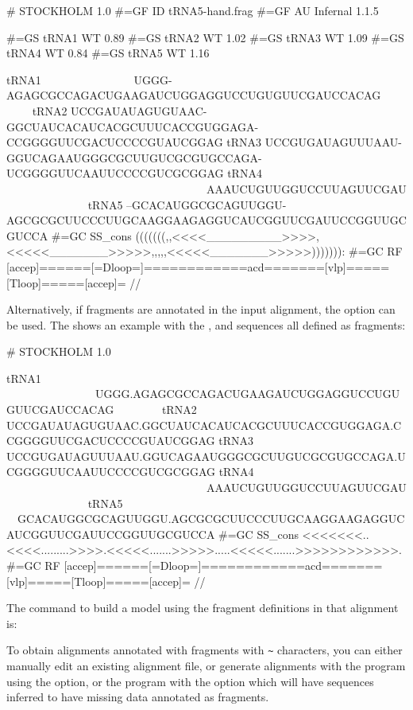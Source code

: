 \begin{sreoutput}
# STOCKHOLM 1.0
#=GF ID tRNA5-hand.frag
#=GF AU Infernal 1.1.5

#=GS tRNA1 WT 0.89
#=GS tRNA2 WT 1.02
#=GS tRNA3 WT 1.09
#=GS tRNA4 WT 0.84
#=GS tRNA5 WT 1.16

tRNA1        ~~~~~~~~~~~~~~~~UGGG-AGAGCGCCAGACUGAAGAUCUGGAGGUCCUGUGUUCGAUCCACAG~~~~~~~~
tRNA2        UCCGAUAUAGUGUAAC-GGCUAUCACAUCACGCUUUCACCGUGGAGA-CCGGGGUUCGACUCCCCGUAUCGGAG
tRNA3        UCCGUGAUAGUUUAAU-GGUCAGAAUGGGCGCUUGUCGCGUGCCAGA-UCGGGGUUCAAUUCCCCGUCGCGGAG
tRNA4        ~~~~~~~~~~~~~~~~~~~~~~~~~~~~~~~~~~~~AAAUCUGUUGGUCCUUAGUUCGAU~~~~~~~~~~~~~~
tRNA5        --GCACAUGGCGCAGUUGGU-AGCGCGCUUCCCUUGCAAGGAAGAGGUCAUCGGUUCGAUUCCGGUUGCGUCCA
#=GC SS_cons (((((((,,<<<<_________>>>>,<<<<<_______>>>>>,,,,,<<<<<_______>>>>>))))))):
#=GC RF      [accep]======[=Dloop=]============acd=======[vlp]=====[Tloop]=====[accep]=
//
\end{sreoutput}

Alternatively, if fragments are annotated in the input alignment, the 
 option can be used. The
 shows an example with the ,
 and  sequences all defined as fragments:

\begin{sreoutput}
# STOCKHOLM 1.0

tRNA1             ~~~~~~~~~~~~~~~~UGGG.AGAGCGCCAGACUGAAGAUCUGGAGGUCCUGUGUUCGAUCCACAG~~~~~~~~
tRNA2             UCCGAUAUAGUGUAAC.GGCUAUCACAUCACGCUUUCACCGUGGAGA.CCGGGGUUCGACUCCCCGUAUCGGAG
tRNA3             UCCGUGAUAGUUUAAU.GGUCAGAAUGGGCGCUUGUCGCGUGCCAGA.UCGGGGUUCAAUUCCCCGUCGCGGAG
tRNA4             ~~~~~~~~~~~~~~~~~~~~~~~~~~~~~~~~~~~~AAAUCUGUUGGUCCUUAGUUCGAU~~~~~~~~~~~~~~
tRNA5             ~~GCACAUGGCGCAGUUGGU.AGCGCGCUUCCCUUGCAAGGAAGAGGUCAUCGGUUCGAUUCCGGUUGCGUCCA
#=GC SS_cons      <<<<<<<..<<<<.........>>>>.<<<<<.......>>>>>.....<<<<<.......>>>>>>>>>>>>.
#=GC RF           [accep]======[=Dloop=]============acd=======[vlp]=====[Tloop]=====[accep]=
//
\end{sreoutput}

The command to build a model using the fragment definitions in
that alignment is:


To obtain alignments annotated with fragments with \verb+~+
characters, you can either manually edit an existing alignment file,
or generate alignments with the  program using the
 option, or the  program with the 
option which will have sequences inferred to have missing data
annotated as fragments.

